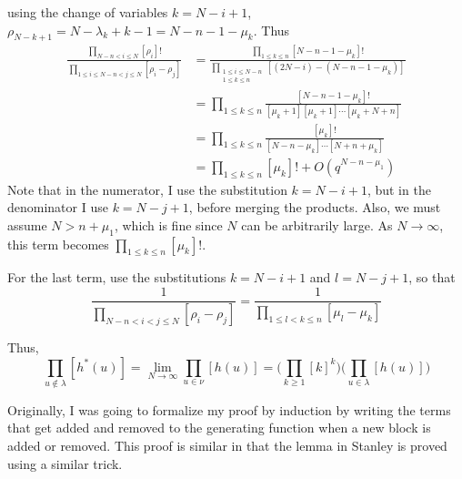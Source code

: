 \documentclass{amsart}
\theoremstyle{definition}
\begin{document}
using the change of variables $k = N - i + 1$, $\rho_{N-k+1} = N -
\lambda_k + k - 1 = N - n - 1 - \mu_k$.  Thus
\begin{align*}
  \frac{\displaystyle
    \prod_{N-n < i \leq N}[\rho_i]!
  }{\displaystyle
    \prod_{1 \leq i \leq N-n < j \leq N}[\rho_i-\rho_j]
  }
  &= \frac{ \displaystyle
    \prod_{1 \leq k \leq n} [N - n - 1 - \mu_k]!
  }{\displaystyle
    \prod_{\substack{1 \leq i \leq N-n \\ 1 \leq k \leq n}} [(2N-i) -
    (N-n-1-\mu_k)]
  } \\
  &= \prod_{1\leq k \leq n} \frac{
    [N-n-1-\mu_k]!
  }{
    [\mu_k+1][\mu_k+1]\cdots [\mu_k + N + n]
    } \\
  &= \prod_{1\leq k \leq n} \frac{[\mu_k]!}{[N-n-\mu_k]\cdots
    [N+n+\mu_k]} \\
  &= \prod_{1\leq k \leq n} [\mu_k]! + O(q^{N-n-\mu_1})
\end{align*}
Note that in the numerator, I use the substitution $k = N - i + 1$,
but in the denominator I use $k = N - j + 1$, before merging the
products.  Also, we must assume $N > n + \mu_1$, which is fine since
$N$ can be arbitrarily large.  As $N \to \infty$, this term becomes
$\prod_{1\leq k\leq n}[\mu_k]!$.

For the last term, use the substitutions $k = N - i + 1$ and $l = N -
j + 1$, so that
\[
  \frac{1}{\displaystyle\prod_{N-n<i<j\leq N}[\rho_i - \rho_j]} =
  \frac{1}{\displaystyle\prod_{1\leq l<k\leq n}
    [\mu_l - \mu_k]}
\]

Thus,
\[
  \prod_{u \notin \lambda} [h^*(u)] =
  \lim_{N\to\infty} \prod_{u \in \nu} [h(u)] =
  \Bigg(\prod_{k\geq 1}[k]^k\Bigg)\Bigg( \prod_{u \in \lambda} [h(u)]\Bigg)
\]

Originally, I was going to formalize my proof by induction by writing
the terms that get added and removed to the generating function when a
new block is added or removed.  This proof is similar in that the
lemma in Stanley is proved using a similar trick.
\end{document}
